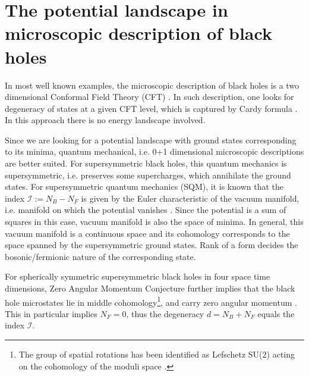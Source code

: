 \documentclass[12pt,a4paper]{JHEP3}
\begin{document}
\section{The potential landscape in microscopic description of black holes} \label{s3}


In most well known examples, the microscopic description of black holes is a two dimensional  Conformal Field Theory (CFT) \cite{Strominger:1996sh, Maldacena:1997de}. In such description, one looks for degeneracy of states at a given CFT level, which is captured by Cardy formula \cite{PhysRevLett.26.1344}. In this approach there is no energy landscape involved. 

Since we are looking for a potential landscape with ground states corresponding to its minima, quantum mechanical, i.e. 0+1 dimensional microscopic descriptions are better suited. For supersymmetric black holes, this quantum mechanics is supersymmetric, i.e. preserves some supercharges, which annihilate the ground states. For supersymmetric  quantum mechanics (SQM), it is known that the index $\mathcal{I} := N_B - N_F$ is  given by the Euler characteristic of the vacuum manifold, i.e. manifold on which the potential vanishes \cite{Witten_morse, Schellekens_Warner, Witten_elliptic}. Since the potential is a sum of squares in this case, vacuum manifold is also the space of minima. In general, this vacuum manifold is a continuous space and its cohomology corresponds to the space spanned by the supersymmetric ground states.
Rank  of a form decides the bosonic/fermionic nature of  the corresponding state.  

For spherically symmetric supersymmetric black holes in four space time dimensions, Zero Angular Momentum Conjecture \cite{Chowdhury:2015gbk} further implies that the black hole microstates lie in middle cohomology\footnote{The group of spatial rotations has been identified as Lefschetz SU(2) acting on the cohomology of the moduli  space \cite{Denef:2002ru, Bena:2012hf}.}, and carry zero angular momentum \cite{Sen:2009gy, Dabholkar:2010rm, Sen:2011ktd, Bringmann:2012zr}.  This in particular implies $N_F=0$, thus the degeneracy $d = N_B + N_F$ equals the index $\mathcal{I}$. 
\end{document}
